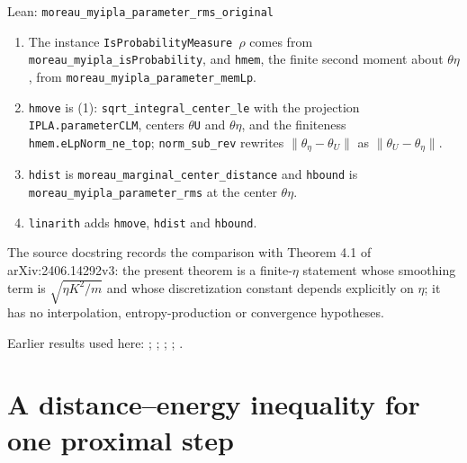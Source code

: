 \documentclass[11pt,a4paper]{report}
\begin{document}
\begin{leanbox}{Lean: \texttt{moreau\_\allowbreak{}myipla\_\allowbreak{}parameter\_\allowbreak{}rms\_\allowbreak{}original}}
\begin{enumerate}


\item The instance \texttt{Is\allowbreak{}Probability\allowbreak{}Measure \ensuremath{\rho}} comes from \texttt{moreau\_\allowbreak{}myipla\_\allowbreak{}is\allowbreak{}Probability}, and \texttt{hmem}, the finite second moment about \texttt{\ensuremath{\theta}\ensuremath{\eta}}, from \texttt{moreau\_\allowbreak{}myipla\_\allowbreak{}parameter\_\allowbreak{}mem\allowbreak{}Lp}.

\item \texttt{hmove} is (1): \texttt{sqrt\_\allowbreak{}integral\_\allowbreak{}center\_\allowbreak{}le} with the projection \texttt{IPLA.\allowbreak{}parameter\allowbreak{}CLM}, centers \texttt{\ensuremath{\theta}\allowbreak{}U} and \texttt{\ensuremath{\theta}\ensuremath{\eta}}, and the finiteness \texttt{hmem.\allowbreak{}e\allowbreak{}Lp\allowbreak{}Norm\_\allowbreak{}ne\_\allowbreak{}top}; \texttt{norm\_\allowbreak{}sub\_\allowbreak{}rev} rewrites \(\|\theta_\eta-\theta_U\|\) as \(\|\theta_U-\theta_\eta\|\).

\item \texttt{hdist} is \texttt{moreau\_\allowbreak{}marginal\_\allowbreak{}center\_\allowbreak{}distance} and \texttt{hbound} is \texttt{moreau\_\allowbreak{}myipla\_\allowbreak{}parameter\_\allowbreak{}rms} at the center \texttt{\ensuremath{\theta}\ensuremath{\eta}}.

\item \texttt{linarith} adds \texttt{hmove}, \texttt{hdist} and \texttt{hbound}.

\end{enumerate}



The source docstring records the comparison with Theorem 4.1 of arXiv:2406.14292v3: the present theorem is a finite-\(\eta\) statement whose smoothing term is \(\sqrt{\eta K^2/m}\) and whose discretization constant depends explicitly on \(\eta\); it has no interpolation, entropy-production or convergence hypotheses.
\end{leanbox}


Earlier results used here: \cite[Section~3.17.4]{LangevinLean2026ULASC}; \cite[Section~3.1.1]{LangevinLean2026IPLA}; \cite[Section~3.1.6]{LangevinLean2026IPLA}; \cite[Section~3.3.1]{LangevinLean2026IPLA}; \cite[Section~3.3.2]{LangevinLean2026IPLA}.
\section{\texorpdfstring{A distance–energy inequality for one proximal step}{A distance–energy inequality for one proximal step}}
\label{proof-module-ProximalLangevin-ProximalEnergy-lean}
\end{document}
